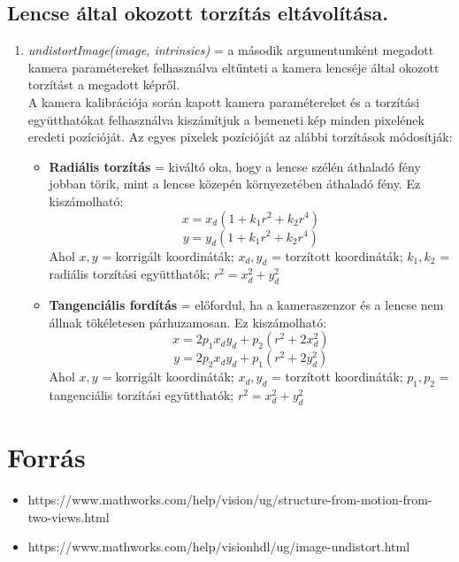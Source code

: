\documentclass[12pt]{report}
\begin{document}
        \section{Lencse által okozott torzítás eltávolítása.}
            \begin{enumerate}
                \item \textit{undistortImage(image, intrinsics)} = a második argumentumként megadott kamera paramétereket felhasználva eltűnteti a kamera lencséje által okozott torzítást a megadott képről.\\
                      A kamera kalibrációja során kapott kamera paramétereket és a torzítási együtthatókat felhasználva kiszámítjuk a bemeneti kép minden pixelének eredeti pozícióját. Az egyes pixelek pozícióját az alábbi torzítások módosítják:
                        \begin{itemize}
                            \item \textbf{Radiális torzítás} = kiváltó oka, hogy a lencse szélén áthaladó fény jobban törik, mint a lencse közepén környezetében áthaladó fény. Ez kiszámolható:\\
                                \[x = x_d(1 + k_1r^2 + k_2r^4)\]
                                \[y = y_d(1 + k_1r^2 + k_2r^4)\]
                                Ahol $x, y$ = korrigált koordináták; $x_d, y_d$ = torzított koordináták; $k_1, k_2$ = radiális torzítási együtthatók; $r^2 = x_d^2 + y_d^2$
                            \item \textbf{Tangenciális fordítás} = előfordul, ha a kameraszenzor és a lencse nem állnak tökéletesen párhuzamosan. Ez kiszámolható:\\
                                \[x = 2p_1x_dy_d + p_2(r^2+2x_d^2)\]
                                \[y = 2p_2x_dy_d + p_1(r^2 + 2y_d^2)\]
                                Ahol $x, y$ = korrigált koordináták; $x_d, y_d$ = torzított koordináták; $p_1, p_2$ = tangenciális torzítási együtthatók; $r^2 = x_d^2 + y_d^2$
                        \end{itemize}
            \end{enumerate}
    \chapter{Forrás}
        \begin{itemize}
            \item https://www.mathworks.com/help/vision/ug/structure-from-motion-from-two-views.html
            \item https://www.mathworks.com/help/visionhdl/ug/image-undistort.html
        \end{itemize}
\end{document}
